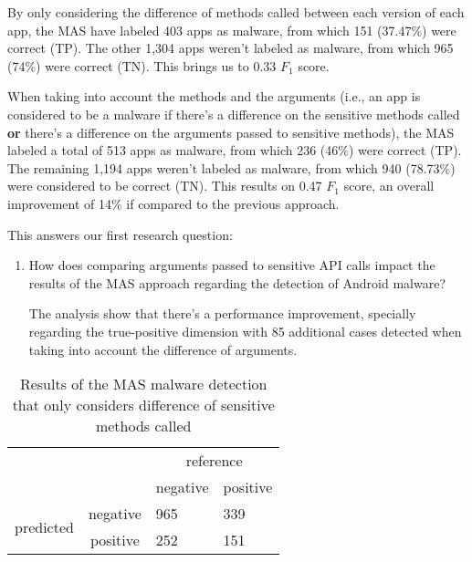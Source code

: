 By only considering the difference of methods called between each version of each app, the MAS have labeled 403 apps as malware, from which 151 (37.47\%) were correct (TP). The other 1,304 apps weren't labeled as malware, from which 965 (74\%) were correct (TN). This brings us to 0.33 $F_1$ score.


When taking into account the methods and the arguments (i.e., an app is considered to be a malware if there's a difference on the sensitive methods called \textbf{or} there's a difference on the arguments passed to sensitive methods), the MAS labeled a total of 513 apps as malware, from which 236 (46\%) were correct (TP). The remaining 1,194 apps weren't labeled as malware, from which 940 (78.73\%) were considered to be correct (TN). This results on 0.47 $F_1$ score, an overall improvement of 14\% if compared to the previous approach.


This answers our first research question: 

\begin{enumerate}
    \item How does comparing arguments passed to sensitive API calls impact the results of the MAS approach regarding the detection of Android malware?

    The analysis show that there's a performance improvement, specially regarding the true-positive dimension with 85 additional cases detected when taking into account the difference of arguments. 
\end{enumerate}

\begin{table}[]
\centering
\caption{Results of the MAS malware detection that only considers difference of sensitive methods called}
\label{tab:prev-confusion-matrix}
\begin{tabular}{llll}
                                                &                               & \multicolumn{2}{c}{reference}                                 \\ \cline{3-4} 
                                                & \multicolumn{1}{l|}{}         & \multicolumn{1}{c|}{negative} & \multicolumn{1}{c|}{positive} \\ \cline{2-4} 
\multicolumn{1}{c|}{\multirow{2}{*}{predicted}} & \multicolumn{1}{c|}{negative} & \multicolumn{1}{l|}{965}      & \multicolumn{1}{l|}{339}      \\ \cline{2-4} 
\multicolumn{1}{c|}{}                           & \multicolumn{1}{c|}{positive} & \multicolumn{1}{l|}{252}      & \multicolumn{1}{l|}{151}      \\ \cline{2-4} 
\end{tabular}
\end{table}

